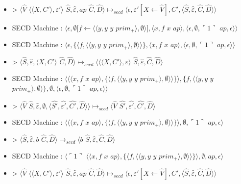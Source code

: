 \documentclass[10pt,a4paper]{article}
\begin{document}
\begin{itemize}
						\item[] > $\langle\widehat{V}$ $\langle\langle X,C'\rangle,\varepsilon'\rangle$ $\widehat{S},\widehat{\varepsilon},ap$ $\widehat{C},\widehat{D}\rangle \longmapsto_{secd} \langle\epsilon,\varepsilon'[X \leftarrow \widehat{V}],C',\langle\widehat{S},\widehat{\varepsilon},\widehat{C},\widehat{D}\rangle\rangle$
						\item[] SECD Machine : $\langle\epsilon,\emptyset[f \leftarrow \langle\langle y,y$ $y$ $prim_{+}\rangle,\emptyset\rangle],\langle x,f$ $x$ $ap\rangle,\langle\epsilon,\emptyset,\ulcorner 1\urcorner$ $ap,\epsilon\rangle\rangle$
						\item[] SECD Machine : $\langle\epsilon,\{\langle f,\langle\langle y,y$ $y$ $prim_{+}\rangle,\emptyset\rangle\rangle\},\langle x,f$ $x$ $ap\rangle,\langle\epsilon,\emptyset,\ulcorner 1\urcorner$ $ap,\epsilon\rangle\rangle$
						\item[] >  $\langle\widehat{S},\widehat{\varepsilon},\langle X,C'\rangle$ $\widehat{C},\widehat{D}\rangle \longmapsto_{secd} \langle\langle\langle X,C'\rangle,\varepsilon\rangle$ $\widehat{S},\widehat{\varepsilon},\widehat{C},\widehat{D}\rangle$
						\item[] SECD Machine : $\langle\langle\langle x,f$ $x$ $ap\rangle,\{\langle f,\langle\langle y,y$ $y$ $prim_{+}\rangle,\emptyset\rangle\rangle\}\rangle,\{f,\langle\langle y,y$ $y$ $prim_{+}\rangle,\emptyset\rangle\},\emptyset,\langle\epsilon,\emptyset,\ulcorner 1\urcorner$ $ap,\epsilon\rangle\rangle$
						\item[] > $\langle\widehat{V}$ $\widehat{S},\widehat{\varepsilon},\emptyset,\langle\widehat{S'},\widehat{\varepsilon'},\widehat{C'},\widehat{D}\rangle\rangle \longmapsto_{secd} \langle \widehat{V}$ $\widehat{S'},\widehat{\varepsilon'},\widehat{C'},\widehat{D}\rangle$
						\item[] SECD Machine : $\langle\langle\langle x,f$ $x$ $ap\rangle,\{\langle f,\langle\langle y,y$ $y$ $prim_{+}\rangle,\emptyset\rangle\rangle\}\rangle,\emptyset,\ulcorner 1\urcorner$ $ap,\epsilon\rangle$
						\item[] >  $\langle\widehat{S},\widehat{\varepsilon},b$ $\widehat{C},\widehat{D}\rangle \longmapsto_{secd} \langle b$ $\widehat{S},\widehat{\varepsilon},\widehat{C},\widehat{D}\rangle$
						\item[] SECD Machine :  $\langle\ulcorner 1\urcorner$ $\langle\langle x,f$ $x$ $ap\rangle,\{\langle f,\langle\langle y,y$ $y$ $prim_{+}\rangle,\emptyset\rangle\rangle\}\rangle,\emptyset,ap,\epsilon\rangle$
						\item[] >  $\langle\widehat{V}$ $\langle\langle X,C'\rangle,\varepsilon'\rangle$ $\widehat{S},\widehat{\varepsilon},ap$ $\widehat{C},\widehat{D}\rangle \longmapsto_{secd} \langle\epsilon,\varepsilon'[X \leftarrow \widehat{V}],C',\langle\widehat{S},\widehat{\varepsilon},\widehat{C},\widehat{D}\rangle\rangle$

\end{itemize}
\end{document}
